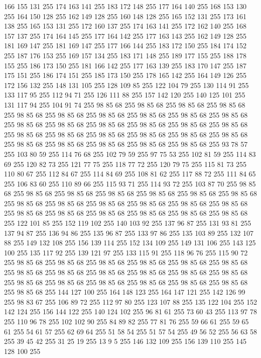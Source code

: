 166 155 131 255 174 163 141 255 183 172 148 255 177 164 140 255 168 153 130 255 164 150 128 255 162 149 128 255 160 148 128 255 165 152 131 255 173 161 138 255 165 153 131 255 172 160 137 255 174 163 141 255 172 162 140 255 168 157 137 255 174 164 145 255 177 164 142 255 177 163 143 255 162 149 128 255 181 169 147 255 181 169 147 255 177 166 144 255 183 172 150 255 184 174 152 255 187 176 153 255 169 157 134 255 183 171 148 255 189 177 155 255 188 178 155 255 186 173 150 255 181 166 142 255 177 163 139 255 183 170 147 255 187 175 151 255 186 174 151 255 185 173 150 255 178 165 142 255 164 149 126 255 172 156 132 255 148 131 105 255 128 109 85 255 122 104 79 255 130 114 91 255 133 117 95 255 112 94 71 255 126 111 88 255 157 142 120 255 140 125 101 255 131 117 94 255 104 91 74 255 98 85 68 255 98 85 68 255 98 85 68 255 98 85 68 255 98 85 68 255 98 85 68 255 98 85 68 255 98 85 68 255 98 85 68 255 98 85 68 255 98 85 68 255 98 85 68 255 98 85 68 255 98 85 68 255
98 85 68 255 98 85 68 255 98 85 68 255 98 85 68 255 98 85 68 255 98 85 68 255 98 85 68 255 98 85 68 255 98 85 68 255 98 85 68 255 98 85 68 255 98 85 68 255 98 85 68 255 93 78 57 255 103 80 59 255 114 76 68 255 102 79 59 255 97 75 53 255 102 81 59 255 114 83 69 255 120 82 73 255 121 77 75 255 118 77 72 255 120 79 75 255 115 81 73 255 110 80 67 255 112 84 67 255 114 84 69 255 108 81 62 255 117 88 72 255 111 84 65 255 106 83 60 255 110 89 66 255 115 93 71 255 114 93 72 255 103 87 70 255 98 85 68 255 98 85 68 255 98 85 68 255 98 85 68 255 98 85 68 255 98 85 68 255 98 85 68 255 98 85 68 255 98 85 68 255 98 85 68 255 98 85 68 255 98 85 68 255 98 85 68 255 98 85 68 255 98 85 68 255 98 85 68 255 98 85 68 255 98 85 68 255 98 85 68 255 122 101 85 255 152 119 102 255 140 103 92 255 137 96 87 255 131 93 81 255 137 94 87 255 136 94 86 255 135 96 87 255 133 97 86 255
135 103 89 255 132 107 88 255 149 132 108 255 156 139 114 255 152 134 109 255 149 131 106 255 143 125 100 255 135 117 92 255 139 121 97 255 133 115 91 255 118 96 76 255 115 90 72 255 98 85 68 255 98 85 68 255 98 85 68 255 98 85 68 255 98 85 68 255 98 85 68 255 98 85 68 255 98 85 68 255 98 85 68 255 98 85 68 255 98 85 68 255 98 85 68 255 98 85 68 255 98 85 68 255 98 85 68 255 98 85 68 255 98 85 68 255 98 85 68 255 98 85 68 255 144 127 100 255 164 148 123 255 164 147 121 255 142 126 99 255 98 83 67 255 106 89 72 255 112 97 80 255 123 107 88 255 135 122 104 255 152 142 124 255 156 144 122 255 140 124 102 255 96 81 61 255 73 60 43 255 113 97 78 255 110 96 78 255 102 102 90 255 84 89 82 255 77 81 76 255 59 66 61 255 59 65 61 255 54 61 57 255 62 69 64 255 51 58 54 255 51 57 54 255 49 56 52 255 56 63 58 255 39 45 42 255 31 25 19 255 13 9 5 255 146 132 109 255 156 139 110 255 145 128 100 255
